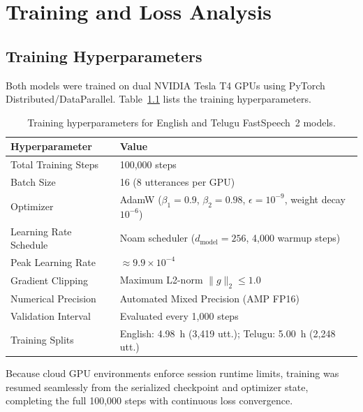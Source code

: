 \documentclass[11pt,a4paper]{report}
\begin{document}
\FloatBarrier
\vspace{1.5em}

\chapter{Training and Loss Analysis}

\section{Training Hyperparameters}
Both models were trained on dual NVIDIA Tesla T4 GPUs using PyTorch Distributed/DataParallel. Table~\ref{tab:hyperparams} lists the training hyperparameters.

\begin{table}[!htbp]
\centering
\caption{Training hyperparameters for English and Telugu FastSpeech~2 models.}
\label{tab:hyperparams}
\small
\begin{tabularx}{\textwidth}{lX}
\toprule
\textbf{Hyperparameter} & \textbf{Value} \\
\midrule
Total Training Steps & 100{,}000 steps \\
Batch Size & 16 (8 utterances per GPU) \\
Optimizer & AdamW ($\beta_1=0.9$, $\beta_2=0.98$, $\epsilon=10^{-9}$, weight decay $10^{-6}$) \\
Learning Rate Schedule & Noam scheduler ($d_{\text{model}}=256$, 4{,}000 warmup steps) \\
Peak Learning Rate & $\approx 9.9 \times 10^{-4}$ \\
Gradient Clipping & Maximum L2-norm $\|g\|_2 \le 1.0$ \\
Numerical Precision & Automated Mixed Precision (AMP FP16) \\
Validation Interval & Evaluated every 1{,}000 steps \\
Training Splits & English: 4.98~h (3{,}419 utt.); Telugu: 5.00~h (2{,}248 utt.) \\
\bottomrule
\end{tabularx}
\end{table}

Because cloud GPU environments enforce session runtime limits, training was resumed seamlessly from the serialized checkpoint and optimizer state, completing the full 100{,}000 steps with continuous loss convergence.
\end{document}
